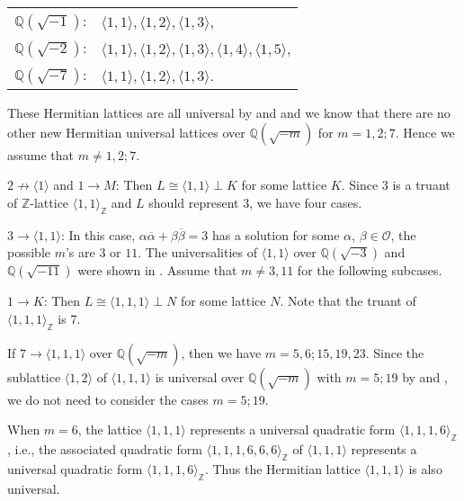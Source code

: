 \documentclass[a4paper,10pt,reqno]{amsart}
\begin{document}
\begin{tabular}{ll}
${\mathbb{Q}(\sqrt{{-1}})}$: & ${\langle {1,1} \rangle}, {\langle {1,2} \rangle}, {\langle {1,3} \rangle}$, \\
${\mathbb{Q}(\sqrt{{-2}})}$: & ${\langle {1,1} \rangle}, {\langle {1,2} \rangle}, {\langle {1,3} \rangle}, {\langle {1,4} \rangle}, {\langle {1,5} \rangle}$, \\
${\mathbb{Q}(\sqrt{{-7}})}$: & ${\langle {1,1} \rangle}, {\langle {1,2} \rangle}, {\langle {1,3} \rangle}$.
\end{tabular}

These Hermitian lattices are all universal by \cite{agE_aK_97} and \cite{jhK_psP} and we know that
there are no other new Hermitian universal lattices over ${\mathbb{Q}(\sqrt{{-m}})}$ for $m=1,2;7$. Hence we assume
that $m \ne 1,2;7$.

{} $2 \not\to {\langle {1} \rangle}$ and $1 \to M$: Then $L \cong {\langle {1,1} \rangle} \perp K$ for some lattice $K$.
Since $3$ is a truant of ${\mathbb{Z}}$-lattice ${\langle {1,1} \rangle}_{\mathbb{Z}}$ and $L$ should represent $3$, we have four
cases.

{} $3 \to {\langle {1,1} \rangle}$: In this case, $\alpha {\overline{{\alpha}}} +
\beta {\overline{{\beta}}} = 3$ has a solution for some $\alpha$, $\beta \in
{\mathcal{O}}$, the possible $m$'s are $3$ or $11$. The universalities of
${\langle {1,1} \rangle}$ over ${\mathbb{Q}(\sqrt{{-3}})}$ and ${\mathbb{Q}(\sqrt{{-11}})}$ were shown in
\cite{agE_aK_97}. Assume that $m \ne 3,11$ for the following
subcases.

{} $1 \to K$: Then $L \cong {\langle {1,1,1} \rangle} \perp N$ for some lattice $N$. Note that the truant
of ${\langle {1,1,1} \rangle}_{\mathbb{Z}}$ is 7.

If $7 \to {\langle {1,1,1} \rangle}$ over ${\mathbb{Q}(\sqrt{{-m}})}$, then we have $m = 5,6;15,19,23$. Since the sublattice
${\langle {1,2} \rangle}$ of ${\langle {1,1,1} \rangle}$ is universal over ${\mathbb{Q}(\sqrt{{-m}})}$ with $m=5;19$ by \cite{agE_aK_97} and
\cite{hI_00}, we do not need to consider the cases $m=5;19$.

{} When $m=6$, the lattice ${\langle {1,1,1} \rangle}$ represents a universal quadratic form
${\langle {1,1,1,6} \rangle}_{\mathbb{Z}}$, i.e., the associated quadratic form ${\langle {1,1,1,6,6,6} \rangle}_{\mathbb{Z}}$ of ${\langle {1,1,1} \rangle}$
represents a universal quadratic form ${\langle {1,1,1,6} \rangle}_{\mathbb{Z}}$. Thus the Hermitian lattice ${\langle {1,1,1} \rangle}$ is
also universal.
\end{document}
